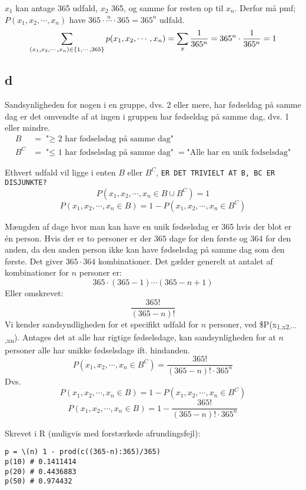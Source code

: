 \documentclass[11pt]{article}
\begin{document}
\(x_1\) kan antage 365 udfald, \(x_2\) 365, og samme for resten op til \(x_n\).
Derfor må pmf; \(P(x_1,x_2,\cdots,x_n)\) have
\(365 \cdot \stackrel{n}{\cdots} \cdot 365 = 365^n\)
udfald.
\[
\sum_{(x_1,x_2,\cdots,x_n) \in \{1,\cdots,365\}} p(x_1,x_2,\cdots,x_n) =
\sum_x \frac{1}{365^n} = 365^n \cdot \frac{1}{365^n} = 1 \\
\]
\subsection*{d}
\label{sec:org14a6f6d}
Sandsynligheden for nogen i en gruppe, dvs. 2 eller mere, har fødseldag på samme dag er det omvendte af at ingen i gruppen har fødseldag på samme dag, dvs. 1 eller mindre.
\begin{align}
B&=\text{"$\ge$ 2 har fødselsdag på samme dag"}\\
B^C&=\text{"$\le$ 1 har fødselsdag på samme dag"} = \text{"Alle har en unik fødselsdag"}
\end{align}

Ethvert udfald vil ligge i enten \(B\) eller \(B^C\), \texttt{ER DET TRIVIELT AT B, BC ER DISJUNKTE?}
\[P(x_1,x_2,\cdots,x_n \in B \cup B^C) = 1\]
\[P(x_1,x_2,\cdots,x_n \in B) = 1 - P(x_1,x_2,\cdots,x_n \in B^C)\]

Mængden af dage hvor man kan have en unik fødselsdag er 365 hvis der blot er én person.
Hvis der er to personer er der 365 dage for den første og 364 for den anden,
da den anden person ikke kan have fødselsdag på samme dag som den første.
Det giver \(365 \cdot 364\) kombinationer.
Det gælder generelt at antalet af kombinationer for \(n\) personer er:
\[365 \cdot (365 - 1) \cdots (365-n+1)\]
Eller omskrevet:
\[\frac{365!}{(365-n)!}\]
Vi kender sandsyndligheden for et specifikt udfald for \(n\) personer,
ved \$P(x\textsubscript{1,x}\textsubscript{2,\(\cdots{}\),x}\textsubscript{n}).
Antages det at alle har rigtige fødselsdage,
kan sandsynligheden for at \(n\) personer alle har unikke fødselsdage ift. hindanden.
\[P(x_1,x_2,\cdots,x_n \in B^C) = \frac{365!}{(365-n)!\cdot 365^n}\]
Dvs.
\[P(x_1,x_2,\cdots,x_n \in B) = 1 - P(x_1,x_2,\cdots,x_n \in B^C)\]
\[P(x_1,x_2,\cdots,x_n \in B) = 1 - \frac{365!}{(365-n)!\cdot 365^n}\]

Skrevet i R (muligvis med forstærkede afrundingsfejl):
\begin{verbatim}
p = \(n) 1 - prod(c((365-n):365)/365)
p(10) # 0.1411414
p(20) # 0.4436883
p(50) # 0.974432
\end{verbatim}
\end{document}
